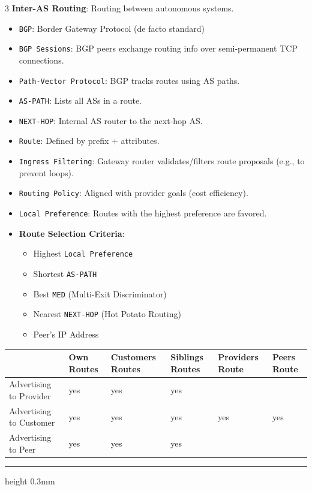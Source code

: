 \documentclass[10pt,landscape]{article}
\begin{document}
\begin{multicols}{3}
\textbf{Inter-AS Routing}: Routing between autonomous systems.
\begin{itemize}
    \setlength{\itemsep}{0pt}
    \item \texttt{BGP}: Border Gateway Protocol (de facto standard)
    \item \texttt{BGP Sessions}: BGP peers exchange routing info over semi-permanent TCP connections.
    \item \texttt{Path-Vector Protocol}: BGP tracks routes using AS paths.
    \item \texttt{AS-PATH}: Lists all ASs in a route.
    \item \texttt{NEXT-HOP}: Internal AS router to the next-hop AS.
    \item \texttt{Route}: Defined by prefix + attributes.
    \item \texttt{Ingress Filtering}: Gateway router validates/filters route proposals (e.g., to prevent loops).
    \item \texttt{Routing Policy}: Aligned with provider goals (cost efficiency).
    \item \texttt{Local Preference}: Routes with the highest preference are favored.
    \item \textbf{Route Selection Criteria}:  
        \begin{itemize}
            \setlength{\itemsep}{0pt}
            \item Highest \texttt{Local Preference}
            \item Shortest \texttt{AS-PATH}
            \item Best \texttt{MED} (Multi-Exit Discriminator)
            \item Nearest \texttt{NEXT-HOP} (Hot Potato Routing)
            \item Peer’s IP Address
        \end{itemize}
\end{itemize}
\begin{tabular}{|p{}|p{}|p{}|p{}|p{}|p{}|}
\hline
\textbf{}               & {\tiny Own Routes} & {\tiny Customers Routes} & {\tiny Siblings Routes} & {\tiny Providers Route} & {\tiny Peers Route} \\ \hline
Advertising to Provider & yes                 & yes                       & yes                      &                          &             \\ \hline
Advertising to Customer & yes                 & yes                       & yes                      & yes                      & yes         \\ \hline
Advertising to Peer     & yes                 & yes                       & yes                      &                          &             \\ \hline
\end{tabular}
\vspace{0.1cm}
\hrule height 0.3mm 
\vspace{0.1cm}


\end{multicols}
\end{document}
